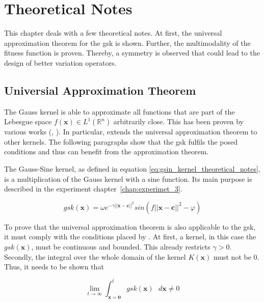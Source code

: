 \documentclass[./\jobname.tex]{subfiles}
\begin{document}
\chapter{Theoretical Notes}
This chapter deals with a few theoretical notes. At first, the universal approximation theorem for the \gls{gsk} is shown. Further, the multimodality of the fitness function is proven. Thereby, a symmetry is observed that could lead to the design of better variation operators.  

\section{Universial Approximation Theorem}
\label{chap:gsin_approximation_theorem}

The Gauss kernel is able to approximate all functions that are part of the Lebesgue space $f(\mathbf{x}) \in L^1(\mathbb{R}^n)$ arbitrarily close. This has been proven by various works (\cite{park_universal_1991}, \cite{hangelbroek_nonlinear_2010}). In particular, \cite{park_universal_1991} extends the universal approximation theorem to other kernels. The following paragraphs show that the \gls{gsk} fulfils the posed conditions and thus can benefit from the approximation theorem. 

The Gauss-Sine kernel, as defined in equation \eqref{eq:gsin_kernel_theoretical_notes}, is a multiplication of the Gauss kernel with a sine function. Its main purpose is described in the experiment \mbox{chapter \ref{chap:experimet_3}}. 

\begin{equation}
\label{eq:gsin_kernel_theoretical_notes}
gsk(\mathbf{x}) = \omega e^{-\gamma ||\mathbf{x} - \mathbf{c}||^2} sin(f ||\mathbf{x} - \mathbf{c}||^2 - \varphi)
\end{equation}

To prove that the universal approximation theorem is also applicable to the \gls{gsk}, it must comply with the conditions placed by \cite{park_universal_1991}. At first, a kernel, in this case the $gsk(\mathbf{x})$, must be continuous and bounded. This already restricts $\gamma > 0$. Secondly, the integral over the whole domain of the kernel $K(\mathbf{x})$ must not be $0$. Thus, it needs to be shown that 

\begin{equation}
\lim_{t \to \infty} \int_{\mathbf{x} = \mathbf{0}}^{t} gsk(\mathbf{x}) \text{ } d\mathbf{x} \neq 0
\end{equation} 
\end{document}
